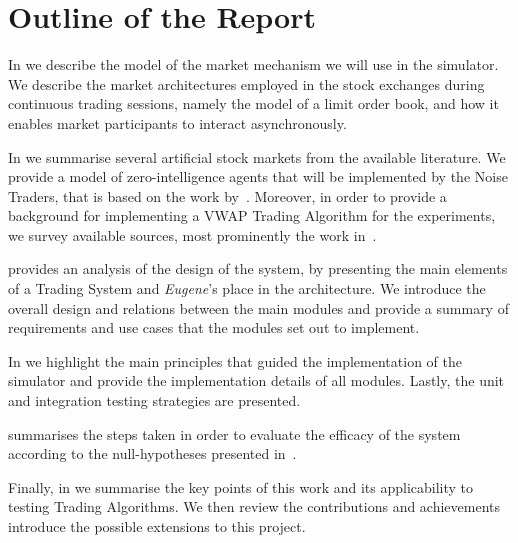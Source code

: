 \section{Outline of the Report \label{Chapters/Introduction/Outline}}

In  we describe the model of the market mechanism we will use in the simulator. We describe the market architectures employed in the stock exchanges during continuous trading sessions, namely the model of a limit order book, and how it enables market participants to interact asynchronously.

In  we summarise several artificial stock markets from the available literature. We provide a model of zero-intelligence agents that will be implemented by the Noise Traders, that is based on the work by~\citet[chap.~4]{Gilles2006}. Moreover, in order to provide a background for implementing a VWAP Trading Algorithm for the experiments, we survey available sources, most prominently the work in~\citet{Coggins2006, Kakade2004}.

 provides an analysis of the design of the system, by presenting the main elements of a Trading System and \textit{Eugene}'s place in the architecture. We introduce the overall design and relations between the main modules and provide a summary of requirements and use cases that the modules set out to implement.

In  we highlight the main principles that guided the implementation of the simulator and provide the implementation details of all modules. Lastly, the unit and integration testing strategies are presented. 

 summarises the steps taken in order to evaluate the efficacy of the system according to the null-hypotheses presented in~.

Finally, in  we summarise the key points of this work and its applicability to testing Trading Algorithms. We then review the contributions and achievements introduce the possible extensions to this project.



